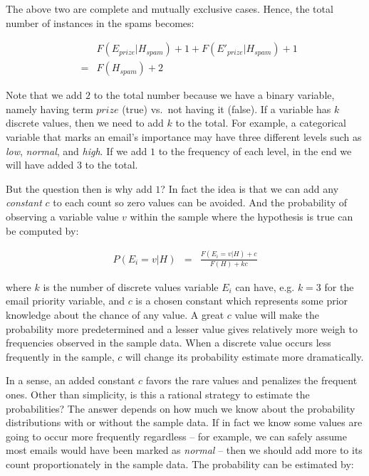 \documentclass[
  letterpaper,
]{scrbook}
\begin{document}
The above two are complete and mutually exclusive cases. Hence, the
total number of instances in the spams becomes:

\[\begin{aligned}
 &   & F(E_{prize} | H_{spam}) + 1 + F(E'_{prize} | H_{spam}) + 1 \\
 & = & F(H_{spam}) + 2
\end{aligned}\]

Note that we add \(2\) to the total number because we have a binary
variable, namely having term \(prize\) (true) vs.~not having it (false).
If a variable has \(k\) discrete values, then we need to add \(k\) to
the total. For example, a categorical variable that marks an email's
importance may have three different levels such as \emph{low},
\emph{normal}, and \emph{high}. If we add \(1\) to the frequency of each
level, in the end we will have added \(3\) to the total.

But the question then is why add \(1\)? In fact the idea is that we can
add any \emph{constant} \(c\) to each count so zero values can be
avoided. And the probability of observing a variable value \(v\) within
the sample where the hypothesis is true can be computed by:

\[\begin{aligned}
P(E_i = v | H) & = & \frac{F(E_i=v | H) + c}{F(H) + kc}
\end{aligned}\]

where \(k\) is the number of discrete values variable \(E_i\) can have,
e.g. \(k=3\) for the email priority variable, and \(c\) is a chosen
constant which represents some prior knowledge about the chance of any
value. A great \(c\) value will make the probability more predetermined
and a lesser value gives relatively more weigh to frequencies observed
in the sample data. When a discrete value occurs less frequently in the
sample, \(c\) will change its probability estimate more dramatically.

In a sense, an added constant \(c\) favors the rare values and penalizes
the frequent ones. Other than simplicity, is this a rational strategy to
estimate the probabilities? The answer depends on how much we know about
the probability distributions with or without the sample data. If in
fact we know some values are going to occur more frequently regardless
-- for example, we can safely assume most emails would have been marked
as \emph{normal} -- then we should add more to its count proportionately
in the sample data. The probability can be estimated by:
\end{document}
